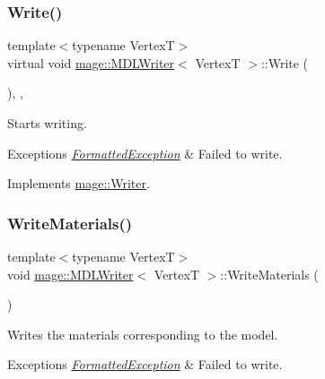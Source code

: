 \subsubsection{\texorpdfstring{Write()}{Write()}}
{\footnotesize\ttfamily template$<$typename VertexT$>$ \\
virtual void \hyperlink{classmage_1_1_m_d_l_writer}{mage\+::\+M\+D\+L\+Writer}$<$ VertexT $>$\+::Write (\begin{DoxyParamCaption}{ }\end{DoxyParamCaption})\hspace{0.3cm}{\ttfamily [override]}, {\ttfamily [private]}, {\ttfamily [virtual]}}

Starts writing.


\begin{DoxyExceptions}{Exceptions}
{\em \hyperlink{structmage_1_1_formatted_exception}{Formatted\+Exception}} & Failed to write. \\
\hline
\end{DoxyExceptions}


Implements \hyperlink{classmage_1_1_writer_a9baf695ef7f6180bef883f60bcb3ac07}{mage\+::\+Writer}.

\hypertarget{classmage_1_1_m_d_l_writer_af9416c1b2599ea86f4af8018dc0b9baf}{}\label{classmage_1_1_m_d_l_writer_af9416c1b2599ea86f4af8018dc0b9baf} 
\subsubsection{\texorpdfstring{Write\+Materials()}{WriteMaterials()}}
{\footnotesize\ttfamily template$<$typename VertexT$>$ \\
void \hyperlink{classmage_1_1_m_d_l_writer}{mage\+::\+M\+D\+L\+Writer}$<$ VertexT $>$\+::Write\+Materials (\begin{DoxyParamCaption}{ }\end{DoxyParamCaption})\hspace{0.3cm}{\ttfamily [private]}}

Writes the materials corresponding to the model.


\begin{DoxyExceptions}{Exceptions}
{\em \hyperlink{structmage_1_1_formatted_exception}{Formatted\+Exception}} & Failed to write. \\
\hline
\end{DoxyExceptions}
\hypertarget{classmage_1_1_m_d_l_writer_a3db84a4600cb777b37c666166a631689}{}\label{classmage_1_1_m_d_l_writer_a3db84a4600cb777b37c666166a631689} 
